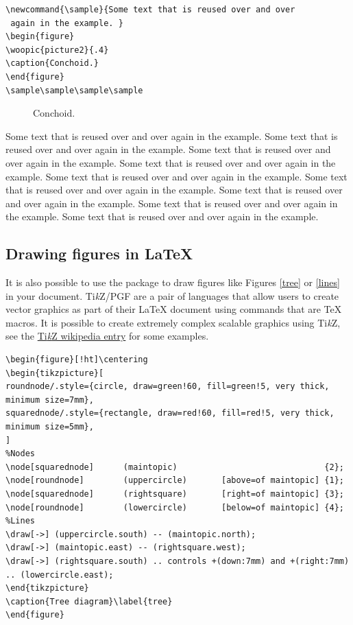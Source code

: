 \begin{singlespace}\small
\begin{verbatim}
\newcommand{\sample}{Some text that is reused over and over
 again in the example. }
\begin{figure}
\woopic{picture2}{.4}
\caption{Conchoid.}
\end{figure}
\sample\sample\sample\sample
\end{verbatim}
\end{singlespace}

\newcommand{\sample}{Some text that is reused over and over again in the example. }
\begin{figure}
\caption{Conchoid.}
\end{figure}
\sample\sample\sample\sample\sample\sample\sample\sample\sample

\subsection{Drawing figures in \LaTeX{}}

It is also possible to use the  package to draw figures like Figures \ref{tree} or \ref{lines} in your document. Ti\emph{k}Z/PGF are a pair of languages that allow users to create vector graphics as part of their \LaTeX{} document using commands that are \TeX{} macros. It is possible to create extremely complex scalable graphics using Ti\emph{k}Z, see the \href{https://en.wikipedia.org/wiki/PGF/TikZ}{Ti\emph{k}Z wikipedia entry} for some examples.

\begin{singlespace}\small
\begin{verbatim}
\begin{figure}[!ht]\centering
\begin{tikzpicture}[
roundnode/.style={circle, draw=green!60, fill=green!5, very thick, minimum size=7mm},
squarednode/.style={rectangle, draw=red!60, fill=red!5, very thick, minimum size=5mm},
]
%Nodes
\node[squarednode]      (maintopic)                              {2};
\node[roundnode]        (uppercircle)       [above=of maintopic] {1};
\node[squarednode]      (rightsquare)       [right=of maintopic] {3};
\node[roundnode]        (lowercircle)       [below=of maintopic] {4};
%Lines
\draw[->] (uppercircle.south) -- (maintopic.north);
\draw[->] (maintopic.east) -- (rightsquare.west);
\draw[->] (rightsquare.south) .. controls +(down:7mm) and +(right:7mm) .. (lowercircle.east);
\end{tikzpicture}
\caption{Tree diagram}\label{tree}
\end{figure}
\end{verbatim}
\end{singlespace}


